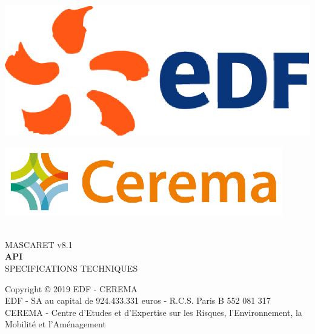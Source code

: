 \documentclass[a4paper,11pt]{article}
\begin{document}
\begin{titlepage}

\begin{center}

\begin{minipage}{0.4\textwidth}
\begin{flushleft} \large
\includegraphics[scale=0.4]{./Figures/EDF_Logo}
\end{flushleft}
\end{minipage}
\begin{minipage}{0.4\textwidth}
\begin{flushright} \large
\includegraphics[scale=1.]{./Figures/CEREMA_Logo}
\end{flushright}
\end{minipage}
\textsc{ }\\[7cm]
\textsc{\Huge MASCARET v8.1}\\[1cm]
{ \huge \bfseries API}\\[1cm]
\textsc{\Large SPECIFICATIONS TECHNIQUES}\\
\vfill

{\Large Copyright {\copyright} 2019 EDF - CEREMA}\\[0.5cm]
{EDF - SA au capital de 924.433.331 euros - R.C.S. Paris B 552 081 317}\\
{CEREMA - Centre d'Etudes et d'Expertise sur les Risques, l'Environnement, la Mobilit\'e et l'Am\'enagement}

\end{center}

\end{titlepage}
\end{document}
